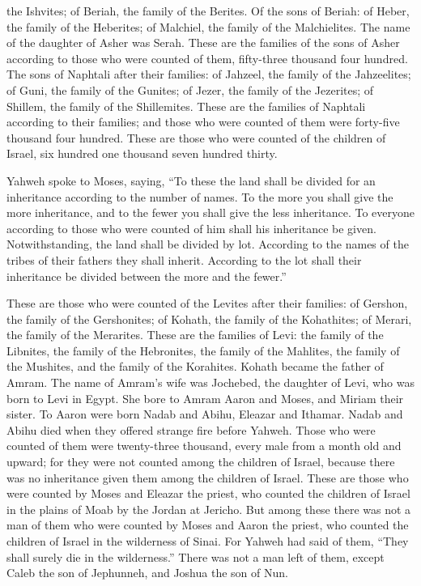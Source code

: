 the Ishvites; of Beriah, the family of the Berites.  Of
the sons of Beriah: of Heber, the family of the Heberites; of Malchiel,
the family of the Malchielites.  The name of the daughter
of Asher was Serah.  These are the families of the sons
of Asher according to those who were counted of them, fifty-three
thousand four hundred.  The sons of Naphtali after their
families: of Jahzeel, the family of the Jahzeelites; of Guni, the family
of the Gunites;  of Jezer, the family of the Jezerites;
of Shillem, the family of the Shillemites.  These are the
families of Naphtali according to their families; and those who were
counted of them were forty-five thousand four hundred. 
These are those who were counted of the children of Israel, six hundred
one thousand seven hundred thirty.

 Yahweh spoke to Moses, saying,  ``To
these the land shall be divided for an inheritance according to the
number of names.  To the more you shall give the more
inheritance, and to the fewer you shall give the less inheritance. To
everyone according to those who were counted of him shall his
inheritance be given.  Notwithstanding, the land shall be
divided by lot. According to the names of the tribes of their fathers
they shall inherit.  According to the lot shall their
inheritance be divided between the more and the fewer.''

 These are those who were counted of the Levites after
their families: of Gershon, the family of the Gershonites; of Kohath,
the family of the Kohathites; of Merari, the family of the Merarites.
 These are the families of Levi: the family of the
Libnites, the family of the Hebronites, the family of the Mahlites, the
family of the Mushites, and the family of the Korahites. Kohath became
the father of Amram.  The name of Amram's wife was
Jochebed, the daughter of Levi, who was born to Levi in Egypt. She bore
to Amram Aaron and Moses, and Miriam their sister.  To
Aaron were born Nadab and Abihu, Eleazar and Ithamar. 
Nadab and Abihu died when they offered strange fire before Yahweh.
 Those who were counted of them were twenty-three
thousand, every male from a month old and upward; for they were not
counted among the children of Israel, because there was no inheritance
given them among the children of Israel.  These are those
who were counted by Moses and Eleazar the priest, who counted the
children of Israel in the plains of Moab by the Jordan at Jericho.
 But among these there was not a man of them who were
counted by Moses and Aaron the priest, who counted the children of
Israel in the wilderness of Sinai.  For Yahweh had said
of them, ``They shall surely die in the wilderness.'' There was not a
man left of them, except Caleb the son of Jephunneh, and Joshua the son
of Nun.

